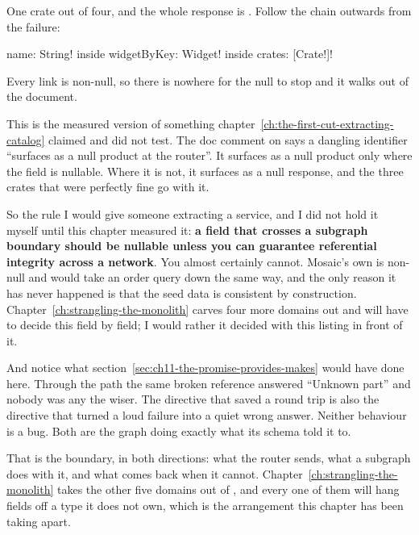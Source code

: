 One crate out of four, and the whole response is . Follow the
chain outwards from the failure:

\begin{graphqlsdl}[fontsize=\footnotesize]
name: String!   inside   widgetByKey: Widget!   inside   crates: [Crate!]!
\end{graphqlsdl}

Every link is non-null, so there is nowhere for the null to stop and it walks
out of the document.

%
This is the measured version of something
chapter~\ref{ch:the-first-cut-extracting-catalog} claimed and did not test. The
doc comment on  says a dangling identifier
\enquote{surfaces as a null product at the router}. It surfaces as a null
product only where the field is nullable. Where it is not, it surfaces as a
null response, and the three crates that were perfectly fine go with it.

So the rule I would give someone extracting a service, and I did not hold it
myself until this chapter measured it: \textbf{a field that crosses a subgraph
boundary should be nullable unless you can guarantee referential integrity
across a network}. You almost certainly cannot. Mosaic's own
 is non-null and would take an order query down the same
way, and the only reason it has never happened is that
the seed data is consistent by construction.
Chapter~\ref{ch:strangling-the-monolith} carves four more domains out and will
have to decide this field by field; I would rather it decided with this listing
in front of it.

%
And notice what section~\ref{sec:ch11-the-promise-provides-makes} would have
done here. Through the  path the same broken reference answered
\enquote{Unknown part} and nobody was any the wiser. The directive that saved a
round trip is also the directive that turned a loud failure into a quiet wrong
answer. Neither behaviour is a bug. Both are the graph doing exactly what its
schema told it to.

\medskip
That is the boundary, in both directions: what the router sends, what a
subgraph does with it, and what comes back when it cannot.
Chapter~\ref{ch:strangling-the-monolith} takes the other five domains out of
, and every one of them will hang fields off a type it does not
own, which is the arrangement this chapter has been taking apart.

%
